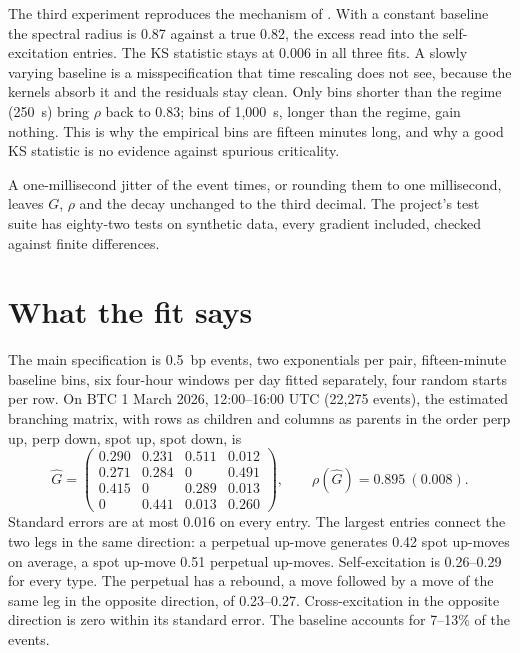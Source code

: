 \documentclass[a4paper,11pt]{article}
\begin{document}
The third experiment reproduces the mechanism of \cite{filimonov2015}. With a constant baseline the spectral radius is 0.87 against a true 0.82, the excess read into the self-excitation entries. The KS statistic stays at 0.006 in all three fits. A slowly varying baseline is a misspecification that time rescaling does not see, because the kernels absorb it and the residuals stay clean. Only bins shorter than the regime (250~s) bring $\rho$ back to 0.83; bins of 1,000~s, longer than the regime, gain nothing. This is why the empirical bins are fifteen minutes long, and why a good KS statistic is no evidence against spurious criticality.

A one-millisecond jitter of the event times, or rounding them to one millisecond, leaves $G$, $\rho$ and the decay unchanged to the third decimal. The project's test suite has eighty-two tests on synthetic data, every gradient included, checked against finite differences.

\section{What the fit says}\label{sec:results}

The main specification is 0.5~bp events, two exponentials per pair, fifteen-minute baseline bins, six four-hour windows per day fitted separately, four random starts per row. On BTC 1 March 2026, 12:00--16:00 UTC (22,275 events), the estimated branching matrix, with rows as children and columns as parents in the order perp up, perp down, spot up, spot down, is
\begin{equation}\label{eq:Ghat}
\hat G = \begin{pmatrix}
0.290 & 0.231 & 0.511 & 0.012 \\
0.271 & 0.284 & 0 & 0.491 \\
0.415 & 0 & 0.289 & 0.013 \\
0 & 0.441 & 0.013 & 0.260
\end{pmatrix}, \qquad \rho(\hat G) = 0.895 \ (0.008).
\end{equation}
Standard errors are at most 0.016 on every entry. The largest entries connect the two legs in the same direction: a perpetual up-move generates 0.42 spot up-moves on average, a spot up-move 0.51 perpetual up-moves. Self-excitation is 0.26--0.29 for every type. The perpetual has a rebound, a move followed by a move of the same leg in the opposite direction, of 0.23--0.27. Cross-excitation in the opposite direction is zero within its standard error. The baseline accounts for 7--13\% of the events.
\end{document}

